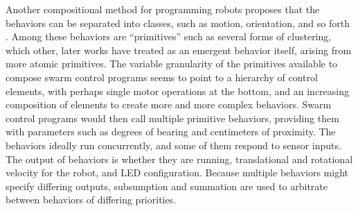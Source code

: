 

Another compositional method for programming robots proposes that the behaviors can be separated into classes, such as motion, orientation, and so forth \citep{mclurkin2004stupid}. 
Among these behaviors are ``primitives'' such as several forms of clustering, which other, later works have treated as an emergent behavior itself, arising from more atomic primitives. 
The variable granularity of the primitives available to compose swarm control programs seems to point to a hierarchy of control elements, with perhaps single motor operations at the bottom, and an increasing composition of elements to create more and more complex behaviors.
Swarm control programs would then call multiple primitive behaviors, providing them with parameters such as degrees of bearing and centimeters of proximity. 
The behaviors ideally run concurrently, and some of them respond to sensor inputs. 
The output of behaviors is whether they are running, translational and rotational velocity for the robot, and LED configuration. 
Because multiple behaviors might specify differing outputs, subsumption and summation are used to arbitrate between behaviors of differing priorities. 

